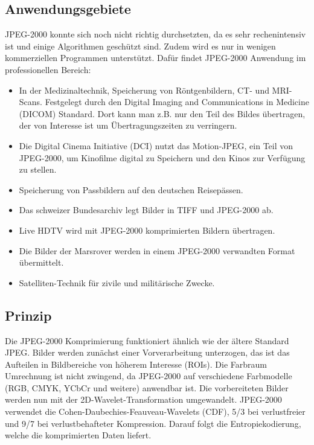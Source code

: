 \subsection{Anwendungsgebiete
\label{jpeg:subsection:anwendungsgebiete}}
JPEG-2000 konnte sich noch nicht richtig durchsetzten, da es sehr rechenintensiv ist und einige Algorithmen geschützt sind.
Zudem wird es nur in wenigen kommerziellen Programmen unterstützt.
Dafür findet JPEG-2000 Anwendung im professionellen Bereich:
\begin{itemize}
    \item In der Medizinaltechnik, Speicherung von Röntgenbildern, CT- und MRI-Scans.
    Festgelegt durch den Digital Imaging and Communications in Medicine (DICOM) Standard.
    Dort kann man z.B. nur den Teil des Bildes übertragen, der von Interesse ist um Übertragungszeiten zu verringern.
    \item Die Digital Cinema Initiative (DCI) nutzt das Motion-JPEG, ein Teil von JPEG-2000, um Kinofilme digital zu Speichern und den Kinos zur Verfügung zu stellen.
    \item Speicherung von Passbildern auf den deutschen Reisepässen.
    \item Das schweizer Bundesarchiv legt Bilder in TIFF und JPEG-2000 ab.
    \item Live HDTV wird mit JPEG-2000 komprimierten Bildern übertragen.
    \item Die Bilder der Marsrover werden in einem JPEG-2000 verwandten Format übermittelt.
    \item Satelliten-Technik für zivile und militärische Zwecke.   
\end{itemize}


\subsection{Prinzip
\label{jpeg:subsection:prinzip}}
Die JPEG-2000 Komprimierung funktioniert ähnlich wie der ältere Standard JPEG.
Bilder werden zunächst einer Vorverarbeitung unterzogen, das ist das Aufteilen in Bildbereiche von höherem Interesse (ROIs).
Die Farbraum Umrechnung ist nicht zwingend, da JPEG-2000 auf verschiedene Farbmodelle (RGB, CMYK, YCbCr und weitere) anwendbar ist.
Die vorbereiteten Bilder werden nun mit der 2D-Wavelet-Transformation umgewandelt.
JPEG-2000 verwendet die Cohen-Daubechies-Feauveau-Wavelets (CDF), 5/3 bei verlustfreier und 9/7 bei verlustbehafteter Kompression.
Darauf folgt die Entropiekodierung, welche die komprimierten Daten liefert. 

